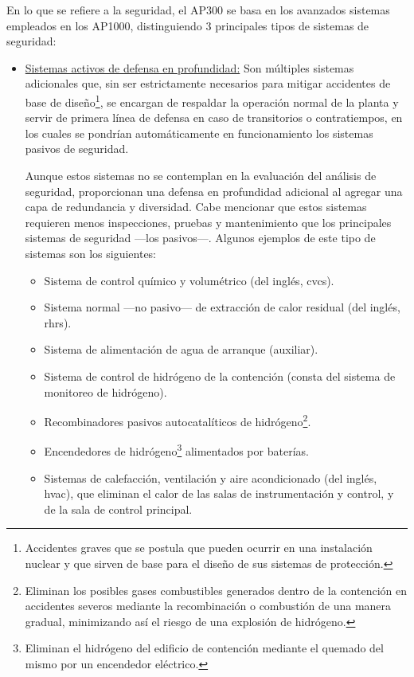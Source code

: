 En lo que se refiere a la seguridad, el AP300 se basa en los avanzados sistemas empleados en los AP1000, distinguiendo 3 principales tipos de sistemas de seguridad:

\begin{itemize}
  \item \underline{Sistemas activos de defensa en profundidad:} Son múltiples sistemas adicionales que, sin ser estrictamente necesarios para mitigar accidentes de base de diseño\footnote{Accidentes graves que se postula que pueden ocurrir en una instalación nuclear y que sirven de base para el diseño de sus sistemas de protección.}, se encargan de respaldar la operación normal de la planta y servir de primera línea de defensa en caso de transitorios o contratiempos, en los cuales se pondrían automáticamente en funcionamiento los sistemas pasivos de seguridad. 
  
  Aunque estos sistemas no se contemplan en la evaluación del análisis de seguridad, proporcionan una defensa en profundidad adicional al agregar una capa de redundancia y diversidad. Cabe mencionar que estos sistemas requieren menos inspecciones, pruebas y mantenimiento que los principales sistemas de seguridad ---los pasivos---. Algunos ejemplos de este tipo de sistemas son los siguientes:

  \begin{itemize}
    \item Sistema de control químico y volumétrico (del inglés, \acrshort{cvcs}).
    \item Sistema normal ---no pasivo--- de extracción de calor residual (del inglés, \acrshort{rhrs}).
    \item Sistema de alimentación de agua de arranque (auxiliar).
    \item Sistema de control de hidrógeno de la contención (consta del sistema de monitoreo de hidrógeno).
    \item R\gls{ecombinadores pasivos} autocatalíticos de hidrógeno\footnote{Eliminan los posibles gases combustibles generados dentro de la contención en accidentes severos mediante la recombinación o combustión de una manera gradual, minimizando así el riesgo de una explosión de hidrógeno.}.
    \item Encendedores de hidrógeno\footnote{Eliminan el hidrógeno del edificio de contención mediante el quemado del mismo por un encendedor eléctrico.} alimentados por baterías.
    \item Sistemas de calefacción, ventilación y aire acondicionado (del inglés, \acrshort{hvac}), que eliminan el calor de las salas de instrumentación y control, y de la sala de control principal.
  \end{itemize}


\end{itemize}
